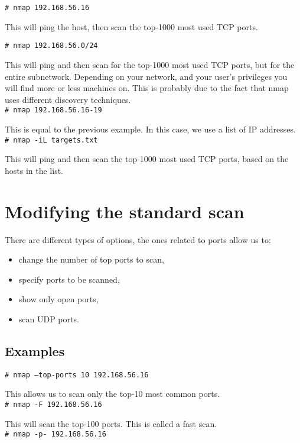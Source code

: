 \documentclass[twocolumn]{article}
\begin{document}
\texttt{\# nmap 192.168.56.16}

This will ping the host, then scan the top-1000 most used TCP ports.

\texttt{\# nmap 192.168.56.0/24}

This will ping and then scan for the top-1000 most used TCP ports, but for the entire subnetwork. Depending on your network, and your user's privileges you will find more or less machines on. This is probably due to the fact that nmap uses different discovery techniques.\\

\texttt{\# nmap 192.168.56.16-19}

This is equal to the previous example. In this case, we use a list of IP addresses.\\

\texttt{\# nmap -iL targets.txt}

This will ping and then scan the top-1000 most used TCP ports, based on the hosts in the list.

\section{Modifying the standard scan}

There are different types of options, the ones related to ports allow us to:

\begin{itemize}
    \item change the number of top ports to scan,
    \item specify ports to be scanned,
    \item show only open ports,
    \item scan UDP ports.
\end{itemize}

\subsection{Examples}

\texttt{\# nmap --top-ports 10 192.168.56.16}

This allows us to scan only the top-10 most common ports.\\

\texttt{\# nmap -F 192.168.56.16}

This will scan the top-100 ports. This is called a fast scan.\\

\texttt{\# nmap -p- 192.168.56.16}
\end{document}
